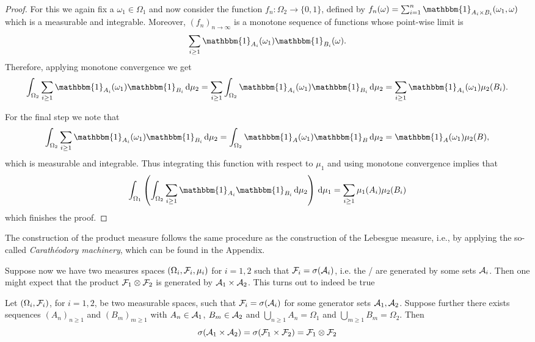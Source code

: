 \begin{proof}
For this we again fix a $\omega_1 \in \Omega_1$ and now consider the function $f_n : \Omega_2 \to \{0,1\}$, defined by $f_n(\omega) = \sum_{i = 1}^n \mathbbm{1}_{A_i \times B_i}(\omega_1, \omega)$ which is a measurable and integrable. Moreover, $(f_n)_{n \to \infty}$ is a monotone sequence of functions whose point-wise limit is 
\[
	\sum_{i \ge 1} \mathbbm{1}_{A_i}(\omega_1) \mathbbm{1}_{B_i}(\omega).
\]
Therefore, applying monotone convergence we get
\[
	\int_{\Omega_2} \sum_{i \ge 1} \mathbbm{1}_{A_i}(\omega_1) \mathbbm{1}_{B_i} \, \dd \mu_2 
	= \sum_{i \ge 1} \int_{\Omega_2} \mathbbm{1}_{A_i}(\omega_1) \mathbbm{1}_{B_i} \, \dd \mu_2 
	= \sum_{i \ge 1} \mathbbm{1}_{A_i}(\omega_1) \mu_2(B_i).
\]

For the final step we note that
\[
	\int_{\Omega_2} \sum_{i \ge 1} \mathbbm{1}_{A_i}(\omega_1) \mathbbm{1}_{B_i} \, \dd \mu_2 = 
	\int_{\Omega_2} \mathbbm{1}_A(\omega_1) \mathbbm{1}_B \, \dd \mu_2 = \mathbbm{1}_{A}(\omega_1)\mu_2(B),
\]
which is measurable and integrable. Thus integrating this function with respect to $\mu_1$ and using monotone convergence implies that
\[
	\int_{\Omega_1} \left(\int_{\Omega_2} \sum_{i \ge 1} \mathbbm{1}_{A_i} \mathbbm{1}_{B_i} \, \dd \mu_2\right) \, \dd \mu_1 = \sum_{i \ge 1} \mu_1(A_i) \mu_2(B_i)
\]
which finishes the proof.
\end{proof}

The construction of the product measure follows the same procedure as the construction of the Lebesgue measure, i.e., by applying the so-called \emph{Carath\'eodory machinery}, which can be found in the Appendix.

Suppose now we have two measures spaces $(\Omega_i, \mathcal F_i, \mu_i)$ for $i = 1,2$ such that $\mathcal F_i = \sigma(\mathcal A_i)$, i.e. the \sigalgs/ are generated by some sets $\mathcal A_i$. Then one might expect that the product $\mathcal F_1 \otimes \mathcal F_2$ is generated by $\mathcal A_1 \times \mathcal A_2$. This turns out to indeed be true

\begin{lemma}\label{lem:product_sigalgs_generators}
Let $(\Omega_i, \mathcal F_i)$, for $i = 1, 2$,  be two measurable spaces, such that $\mathcal F_i = \sigma(\mathcal A_i)$ for some generator sets $\mathcal A_1, \mathcal A_2$. Suppose further there exists sequences $(A_n)_{n \ge 1}$ and $(B_m)_{m \ge 1}$ with $A_n \in \mathcal A_1$, $B_m \in \mathcal A_2$ and $\bigcup_{n \ge 1} A_n = \Omega_1$ and $\bigcup_{m \ge 1} B_m = \Omega_2$. Then
\[
	\sigma(\mathcal A_1 \times \mathcal A_2) = \sigma(\mathcal F_1 \times \mathcal F_2) = \mathcal F_1 \otimes \mathcal F_2
\] 
\end{lemma}

